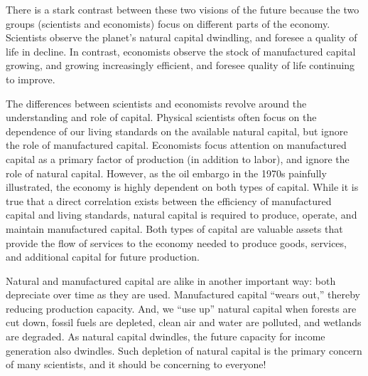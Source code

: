 There is a stark contrast between these two visions of the future 
because the two groups (scientists and economists) focus on 
different parts of the economy.
Scientists observe the planet's natural capital dwindling, 
and foresee a quality of life in decline.
In contrast, economists observe the stock of manufactured capital growing, 
and growing increasingly efficient, 
and foresee quality of life continuing to improve. 

The differences between scientists and economists revolve around 
the understanding and role of capital.
Physical scientists often focus on the dependence of our
living standards on the available natural capital, but ignore the role of manufactured capital. 
Economists focus attention on manufactured capital 
as a primary factor of production (in addition to labor), 
and ignore the role of natural capital. 
However, as the oil embargo in the 1970s 
painfully illustrated, the economy is highly dependent on both types of capital.
While it is true that a direct correlation exists between the efficiency of manufactured capital
and living standards, natural capital is required 
to produce, operate, and maintain manufactured capital. Both types of capital are valuable
assets that provide the flow of services to the economy needed to produce
goods, services, and additional capital for future production.

Natural and manufactured capital are alike in another important way:
both depreciate over time as they are used.
Manufactured capital ``wears out,'' thereby reducing production capacity. 
And, we ``use up'' natural capital when forests are cut
down, fossil fuels are depleted, clean air and water are polluted, 
and wetlands are degraded. 
As natural capital dwindles, the future
capacity for income generation also dwindles. 
Such depletion of natural capital is the primary concern of many scientists, 
and it should be concerning to everyone!


